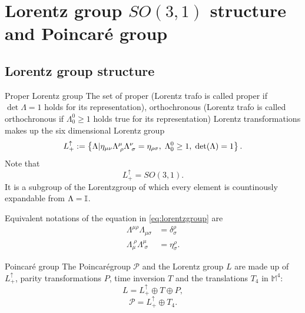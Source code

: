 \section{Lorentz group $SO(3,1)$ structure and Poincaré group}
\subsection{Lorentz group structure}
\begin{mybox}{Proper Lorentz group}
	The set of proper (Lorentz trafo is called proper if $\det\Lambda=1$ holds for its representation), orthochronous (Lorentz trafo is called orthochronous if $\Lambda^0_0 \geq 1$ holds true for its representation) Lorentz transformations makes up the six dimensional Lorentz group
	\begin{equation}
	\label{eq:lorentzgroup}
	L^\uparrow_+ :=\left\{	\Lambda| \eta_{\mu \nu}\Lambda^\mu_{\;\rho} \Lambda^\nu_{\;\sigma} = \eta_{\rho \sigma}, \; \Lambda^0_0 \geq 1,\; \det(\Lambda)=1\right\}.
	\end{equation}
	Note that 
	\begin{equation}
		L^\uparrow_+ = SO(3,1).
	\end{equation}
	It is a subgroup of the Lorentzgroup of which every element is countinously expandable from $\Lambda=\mathbb{I}$.
\end{mybox}
Equivalent notations of the equation in \ref{eq:lorentzgroup} are
\begin{align}
	\Lambda^{\mu \rho} \Lambda_{\mu \sigma} &= \delta^\rho_\sigma \\
	\Lambda^{\;\rho}_\mu \Lambda^\mu_{\;\sigma} &= \eta^\rho_\sigma.
\end{align}
\begin{mybox}{Poincaré group}
	The Poincarégroup $\mathcal{P}$ and the Lorentz group $L$ are made up of $L^\uparrow_+$, parity transformations $P$, time inversion $T$ and the translations $T_4$ in $\mathbb{M}^4$:
	\begin{equation}
	\label{eq:lorentzgroupwhole}
	L = L^\uparrow_+ \oplus T \oplus P,
	\end{equation}
	\begin{equation}
	\label{eq:poincaregroup}
	\mathcal{P}=L^\uparrow_+ \oplus T_4.
	\end{equation}
\end{mybox}


